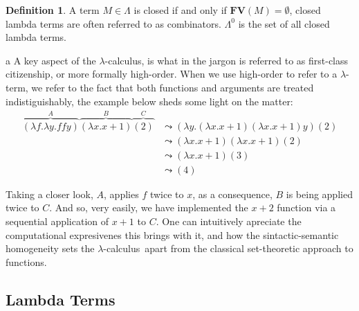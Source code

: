 \documentclass[12pt]{book}
\newcommand{\la}{\lambda}
\newcommand{\lcalc}{$\la$-calculus}
\newcommand{\functionfont}[1]{\mathbf{#1}}
\newcommand{\curly}{\mathrel{\leadsto}}
\newcommand{\FV}[1]{\functionfont{FV}(#1)}
\theoremstyle{plain}
\theoremstyle{definition}
\newtheorem{definition}{Definition}[section]
\theoremstyle{definition}
\theoremstyle{definition}
\begin{document}
\begin{definition}
  A term $M \in \Lambda$ is closed if and only if $\FV M = \emptyset$, closed lambda terms are often referred to as combinators. $\Lambda^0$ is the set of all closed lambda terms.
\end{definition}



















\newpage
a
\newpage
A key aspect of the \lcalc, is what in the jargon is referred to as first-class citizenship, or more formally high-order. When we use high-order to refer to a $\la$-term, we refer to the fact that both functions and arguments are treated indistiguishably, the example below sheds some light on the matter:
\begin{align*}
  \overbrace { (\lambda f . \lambda y . f f y) }^{A} \overbrace{ (\lambda x . x + 1) }^{B} \overbrace{(2)}^{C}
  &\curly (\lambda y .(\lambda x . x + 1) (\lambda x . x + 1)y)(2) \\
  &\curly (\lambda x . x + 1)(\lambda x . x + 1)(2) \\
  &\curly (\lambda x . x + 1) (3) \\
  &\curly (4)
\end{align*}

Taking a closer look, $A$, applies $f$ twice to $x$, as a consequence, $B$ is being applied twice to $C$. And so, very easily, we have implemented the $ x + 2 $ function via a sequential application of $x + 1$ to $C$. One can intuitively apreciate the computational expresivenes this brings with it, and how the sintactic-semantic homogeneity sets the \lcalc \ apart from the classical set-theoretic approach to functions.

\subsection{\centering
  Lambda Terms}
\end{document}
